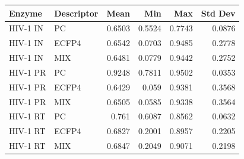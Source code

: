 \begin{tabular}{llrrrr}
\toprule
Enzyme & Descriptor & Mean & Min & Max & Std Dev \\
\midrule
HIV-1 IN & PC & 0.6503 & 0.5524 & 0.7743 & 0.0876 \\
HIV-1 IN & ECFP4 & 0.6542 & 0.0703 & 0.9485 & 0.2778 \\
HIV-1 IN & MIX & 0.6481 & 0.0779 & 0.9442 & 0.2752 \\
HIV-1 PR & PC & 0.9248 & 0.7811 & 0.9502 & 0.0353 \\
HIV-1 PR & ECFP4 & 0.6429 & 0.059 & 0.9381 & 0.3568 \\
HIV-1 PR & MIX & 0.6505 & 0.0585 & 0.9338 & 0.3564 \\
HIV-1 RT & PC & 0.761 & 0.6087 & 0.8562 & 0.0632 \\
HIV-1 RT & ECFP4 & 0.6827 & 0.2001 & 0.8957 & 0.2205 \\
HIV-1 RT & MIX & 0.6847 & 0.2049 & 0.9071 & 0.2198 \\
\bottomrule
\end{tabular}
